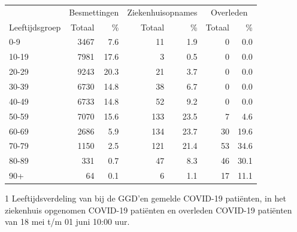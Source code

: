 \documentclass[
  english,
  man,floatsintext]{apa6}
\begin{document}
\begin{table}
\centering\begingroup\fontsize{11}{13}\selectfont

\begin{threeparttable}
\begin{tabular}{lrrrrrr}
\toprule
\multicolumn{1}{c}{ } & \multicolumn{2}{c}{Besmettingen} & \multicolumn{2}{c}{Ziekenhuisopnames} & \multicolumn{2}{c}{Overleden} \\
\cmidrule(l{3pt}r{3pt}){2-3} \cmidrule(l{3pt}r{3pt}){4-5} \cmidrule(l{3pt}r{3pt}){6-7}
Leeftijdsgroep & Totaal & \% & Totaal & \% & Totaal & \%\\
\midrule
0-9 & 3467 & 7.6 & 11 & 1.9 & 0 & 0.0\\
10-19 & 7981 & 17.6 & 3 & 0.5 & 0 & 0.0\\
20-29 & 9243 & 20.3 & 21 & 3.7 & 0 & 0.0\\
30-39 & 6730 & 14.8 & 38 & 6.7 & 0 & 0.0\\
40-49 & 6733 & 14.8 & 52 & 9.2 & 0 & 0.0\\
50-59 & 7070 & 15.6 & 133 & 23.5 & 7 & 4.6\\
60-69 & 2686 & 5.9 & 134 & 23.7 & 30 & 19.6\\
70-79 & 1150 & 2.5 & 121 & 21.4 & 53 & 34.6\\
80-89 & 331 & 0.7 & 47 & 8.3 & 46 & 30.1\\
90+ & 64 & 0.1 & 6 & 1.1 & 17 & 11.1\\
\bottomrule
\end{tabular}
\begin{tablenotes}
\item[1] Leeftijdsverdeling van bij de GGD’en gemelde COVID-19 patiënten, in het ziekenhuis opgenomen COVID-19 patiënten en overleden COVID-19 patiënten van 18 mei t/m 01 juni 10:00 uur.
\end{tablenotes}
\end{threeparttable}
\endgroup{}
\end{table}

\newpage
\end{document}
